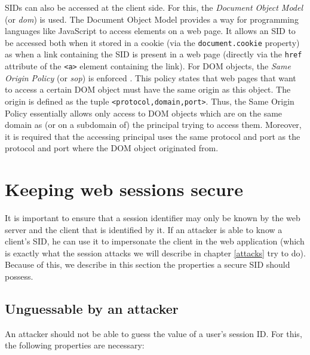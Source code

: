 \label{sop}SIDs can also be accessed at the client side. For this, the \emph{Document Object Model} (or \emph{\gls{dom}}) is used. The Document Object Model provides a way for programming languages like JavaScript to access elements on a web page. It allows an SID to be accessed both when it stored in a cookie (via the \texttt{document.cookie} property) as when a link containing the SID is present in a web page (directly via the \texttt{href} attribute of the \texttt{<a>} element containing the link). For DOM objects, the \emph{Same Origin Policy} (or \emph{\gls{sop}}) is enforced \cite{Singh2010}. This policy states that web pages that want to access a certain DOM object must have the same origin as this object. The origin is defined as the tuple \texttt{<protocol,domain,port>}. Thus, the Same Origin Policy essentially allows only access to DOM objects which are on the same domain as (or on a subdomain of) the principal trying to access them. Moreover, it is required that the accessing principal uses the same protocol and port as the protocol and port where the DOM object originated from.

\section{Keeping web sessions secure}\label{secure-sessions}

It is important to ensure that a session identifier may only be known by the web server and the client that is identified by it. If an attacker is able to know a client's SID, he can use it to impersonate the client in the web application (which is exactly what the session attacks we will describe in chapter \ref{attacks} try to do). Because of this, we describe in this section the properties a secure SID should possess.

\subsection{Unguessable by an attacker}

An attacker should not be able to guess the value of a user's session ID. For this, the following properties are necessary:

